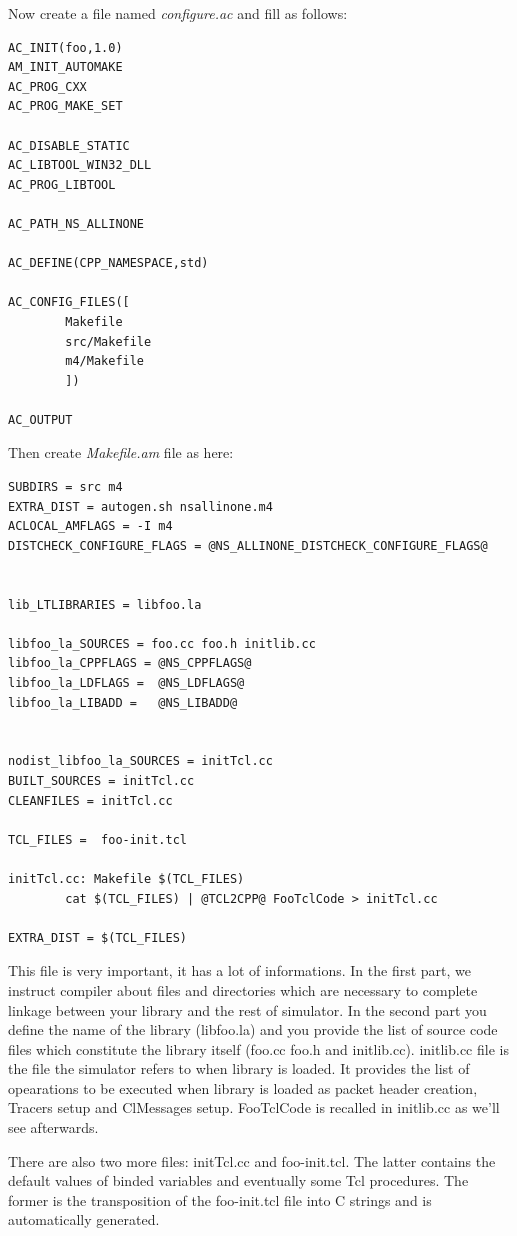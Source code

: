 \documentclass[a4paper,10pt]{article}
\begin{document}
Now create a file named \emph{configure.ac} and fill as follows:
\begin{verbatim}
AC_INIT(foo,1.0)
AM_INIT_AUTOMAKE
AC_PROG_CXX
AC_PROG_MAKE_SET

AC_DISABLE_STATIC
AC_LIBTOOL_WIN32_DLL
AC_PROG_LIBTOOL

AC_PATH_NS_ALLINONE

AC_DEFINE(CPP_NAMESPACE,std)

AC_CONFIG_FILES([
		Makefile
		src/Makefile
		m4/Makefile
		])
		
AC_OUTPUT
\end{verbatim}

Then create \emph{Makefile.am} file as here:
\begin{verbatim}
SUBDIRS = src m4
EXTRA_DIST = autogen.sh nsallinone.m4
ACLOCAL_AMFLAGS = -I m4
DISTCHECK_CONFIGURE_FLAGS = @NS_ALLINONE_DISTCHECK_CONFIGURE_FLAGS@


lib_LTLIBRARIES = libfoo.la

libfoo_la_SOURCES = foo.cc foo.h initlib.cc
libfoo_la_CPPFLAGS = @NS_CPPFLAGS@ 
libfoo_la_LDFLAGS =  @NS_LDFLAGS@
libfoo_la_LIBADD =   @NS_LIBADD@ 


nodist_libfoo_la_SOURCES = initTcl.cc
BUILT_SOURCES = initTcl.cc
CLEANFILES = initTcl.cc

TCL_FILES =  foo-init.tcl

initTcl.cc: Makefile $(TCL_FILES)
		cat $(TCL_FILES) | @TCL2CPP@ FooTclCode > initTcl.cc

EXTRA_DIST = $(TCL_FILES)
\end{verbatim}
This file is very important, it has a lot of informations. In the first part, we instruct compiler about files and directories which are necessary to complete linkage between your library and the rest of simulator. In the second part you define the name of the library (libfoo.la) and you provide the list of source code files which constitute the library itself (foo.cc foo.h and initlib.cc). initlib.cc file is the file the simulator refers to when library is loaded. It provides the list of opearations to be executed when library is loaded as packet header creation, Tracers setup and ClMessages setup.
FooTclCode is recalled in initlib.cc as we'll see afterwards.

There are also two more files: initTcl.cc and foo-init.tcl. The latter contains the default values of binded variables and eventually some Tcl procedures. The former is the transposition of the foo-init.tcl file into C strings and is automatically generated.
\end{document}
